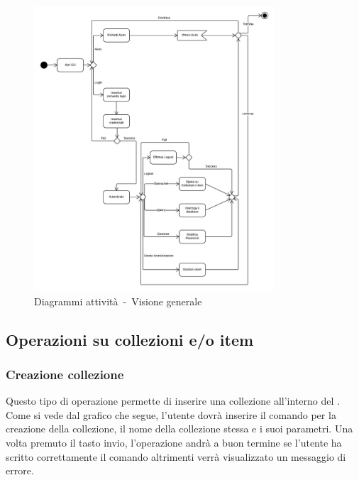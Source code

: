 \documentclass{scalatekids-article}
\begin{document}
\begin{figure}[H]
  \begin{center}
    \includegraphics[width=0.8\textwidth, keepaspectratio]{img/diagrammiAttivita/visioneGenerale.jpeg}
    \caption{Diagrammi attività\ -\ Visione generale}
  \end{center}
\end{figure}

\subsection{Operazioni su collezioni e/o item}
\subsubsection{Creazione collezione}

Questo tipo di operazione permette di inserire una collezione all'interno del
. Come si vede dal grafico che segue, l'utente dovrà inserire il
comando per la creazione della collezione, il nome della collezione stessa e i
suoi parametri. Una volta premuto il tasto invio, l'operazione andrà a buon
termine se l'utente ha scritto correttamente il comando altrimenti verrà
visualizzato un messaggio di errore.
\end{document}
